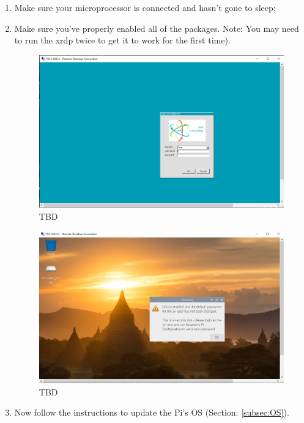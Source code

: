 \documentclass{article}\usepackage[]{graphicx}\usepackage[]{color}
\begin{document}
\begin{enumerate}
\item Make sure your microprocessor is connected and hasn't gone to sleep;

\item Make sure you've properly enabled all of the packages. Note: You may need to run the  xrdp twice to get it to work for the first time). 

\begin{figure}
\includegraphics[width=\textwidth]{images/3A-3_Remote_Login.png}
\caption{TBD}
\label{fig:3A-3}
\end{figure}

\begin{figure}
\includegraphics[width=\textwidth]{images/3A-4_Remote_Connected.png}
\caption{TBD}
\label{fig:3A-4}
\end{figure}

\item Now follow the instructions to update the Pi's OS (Section: \ref{subsec:OS}).

\end{enumerate}
\end{document}
